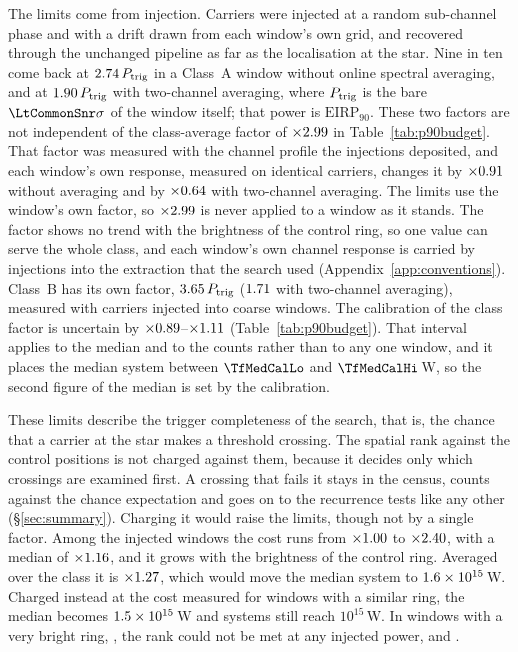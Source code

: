 The limits come from injection. Carriers were injected at a random
sub-channel phase and with a drift drawn from each window's own grid, and
recovered through the unchanged pipeline as far as the localisation at the
star. Nine in ten come back at $2.74\,P_{\rm trig}$ in a Class~A window
without online spectral averaging, and at $1.90\,P_{\rm trig}$ with
two-channel averaging, where $P_{\rm trig}$ is the bare
$\LtCommonSnr\sigma$ of the window itself; that power is
$\mathrm{EIRP}_{90}$. These two factors are not independent of the
class-average factor of $\times2.99$ in Table~\ref{tab:p90budget}.
That factor was measured with the channel profile the injections deposited,
and each window's own response, measured on identical carriers, changes it by
$\times0.91$ without averaging and by $\times0.64$ with
two-channel averaging. The limits use the window's own factor, so
$\times2.99$ is never applied to a window as it stands. The factor shows no trend with the brightness of the
control ring, so one value can serve the whole class, and each window's own
channel response is carried by injections into the extraction that the
search used (Appendix~\ref{app:conventions}). Class~B has its own factor,
$3.65\,P_{\rm trig}$ ($1.71$ with two-channel averaging),
measured with \SensNToneCoarse{} carriers injected into \SensNInjCoarse{}
coarse windows. The calibration of the class factor is uncertain by
$\times0.89$--$\times1.11$ (Table~\ref{tab:p90budget}). That
interval applies to the median and to the counts rather than to any one
window, and it places the median system between $\TfMedCalLo$ and
$\TfMedCalHi$\,W, so the second figure of the median is set by the
calibration.

These limits describe the trigger completeness of the search, that is, the
chance that a carrier at the star makes a threshold crossing. The spatial
rank against the \NCtrl{} control positions is not charged against
them, because it decides only which crossings are examined first. A crossing
that fails it stays in the census, counts against the chance expectation and
goes on to the recurrence tests like any other (\S\ref{sec:summary}).
Charging it would raise the limits, though not by a single factor. Among the
injected windows the cost runs from $\times1.00$ to
$\times2.40$, with a median of $\times1.16$, and it grows
with the brightness of the control ring. Averaged over the class it is
$\times1.27$, which would move the median system to
$1.6\times10^{15}$\,W. Charged instead at the cost measured for windows
with a similar ring, the median becomes $1.5\times10^{15}$\,W and
\RcNSysEfifteenStrat{} systems still reach $10^{15}$\,W. In
\SensNRingHiUnres{} windows with a very bright ring, \RcNoRankWins, the rank
could not be met at any injected power, and \RcNoRankSysClause.

